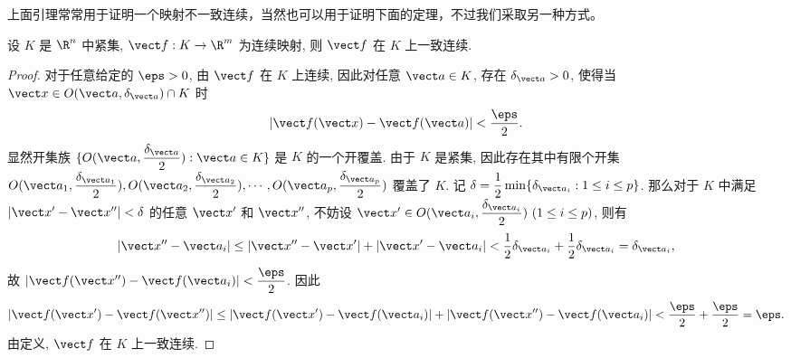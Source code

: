 上面引理常常用于证明一个映射不一致连续，当然也可以用于证明下面的定理，不过我们采取另一种方式。
\begin{theorem}[一致连续性定理]
	设 $K$ 是 $\R^n$ 中紧集, $\vect f: K \to \R^m$ 为连续映射, 则 $\vect f$ 在 $K$ 上一致连续.
\end{theorem}

\begin{proof}
	对于任意给定的 $\eps > 0$, 由 $\vect f$ 在 $K$ 上连续, 因此对任意 $\vect a \in K$, 存在 $\delta_{\vect a} > 0$, 使得当 $\vect x \in O(\vect a, \delta_{\vect a}) \cap K$ 时
	\[
	|\vect f(\vect x) - \vect f(\vect a)| < \frac{\eps}{2}.
	\]
	显然开集族 $\{ O(\vect a, \dfrac{\delta_{\vect a}}{2}): \vect a \in K \}$ 是 $K$ 的一个开覆盖. 由于 $K$ 是紧集, 因此存在其中有限个开集 $O(\vect a_1, \dfrac{\delta_{\vect a_1}}{2}), O(\vect a_2, \dfrac{\delta_{\vect a_2}}{2}), \cdots, O(\vect a_p, \dfrac{\delta_{\vect a_p}}{2})$ 覆盖了 $K$. 记 $\delta = \dfrac{1}{2} \min\{\delta_{\vect a_i}: 1 \le i \le p\}$. 那么对于 $K$ 中满足 $|\vect x' - \vect x''| < \delta$ 的任意 $\vect x'$ 和 $\vect x''$, 不妨设 $\vect x' \in O(\vect a_i, \dfrac{\delta_{\vect a_i}}{2})\ (1 \le i \le p)$, 则有
	\[
	|\vect x'' - \vect a_i| \le |\vect x'' - \vect x'| + |\vect x' - \vect a_i| < \frac{1}{2}\delta_{\vect a_i} + \frac{1}{2}\delta_{\vect a_i} = \delta_{\vect a_i},
	\]
	故 $|\vect f(\vect x'') - \vect f(\vect a_i)| < \dfrac{\eps}{2}$. 因此
	\[
	|\vect f(\vect x') - \vect f(\vect x'')| \le |\vect f(\vect x') - \vect f(\vect a_i)| + |\vect f(\vect x'') - \vect f(\vect a_i)| < \frac{\eps}{2} + \frac{\eps}{2} = \eps.
	\]
	由定义, $\vect f$ 在 $K$ 上一致连续.
\end{proof}
